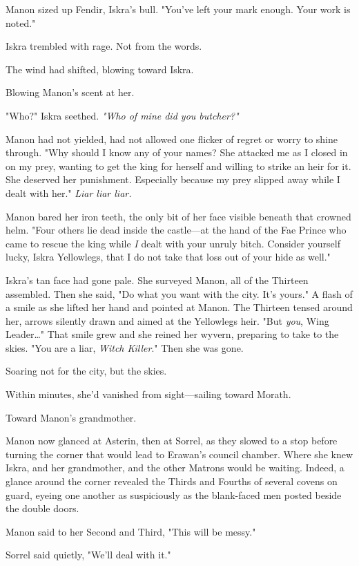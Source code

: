 Manon sized up Fendir, Iskra's bull.
"You've left your mark enough.
Your work is noted."

Iskra trembled with rage.
Not from the words.

The wind had shifted, blowing toward Iskra.

Blowing Manon's scent at her.

"Who?"
Iskra seethed.
\emph{"Who of mine did you butcher?"}

Manon had not yielded, had not allowed one flicker of regret or worry to shine through.
"Why should I know any of your names?
She attacked me as I closed in on my prey, wanting to get the king for herself and willing to strike an heir for it.
She deserved her punishment.
Especially because my prey slipped away while I dealt with her."
\emph{Liar liar liar.}

Manon bared her iron teeth, the only bit of her face visible beneath that crowned helm.
"Four others lie dead inside the castle---at the hand of the Fae Prince who came to rescue the king while \emph{I} dealt with your unruly bitch.
Consider yourself lucky, Iskra Yellowlegs, that I do not take that loss out of your hide as well."

Iskra's tan face had gone pale.
She surveyed Manon, all of the Thirteen assembled.
Then she said, "Do what you want with the city.
It's yours."
A flash of a smile as she lifted her hand and pointed at Manon.
The Thirteen tensed around her, arrows silently drawn and aimed at the Yellowlegs heir.
"But \emph{you}, Wing Leader\ldots" That smile grew and she reined her wyvern, preparing to take to the skies.
"You are a liar, \emph{Witch Killer}."
Then she was gone.

Soaring not for the city, but the skies.

Within minutes, she'd vanished from sight---sailing toward Morath.

Toward Manon's grandmother.

Manon now glanced at Asterin, then at Sorrel, as they slowed to a stop before turning the corner that would lead to Erawan's council chamber.
Where she knew Iskra, and her grandmother, and the other Matrons would be waiting.
Indeed, a glance around the corner revealed the Thirds and Fourths of several covens on guard, eyeing one another as suspiciously as the blank-faced men posted beside the double doors.

Manon said to her Second and Third, "This will be messy."

Sorrel said quietly, "We'll deal with it."

